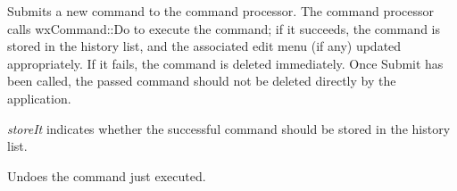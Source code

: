 Submits a new command to the command processor. The command processor
calls wxCommand::Do to execute the command; if it succeeds, the command
is stored in the history list, and the associated edit menu (if any) updated
appropriately. If it fails, the command is deleted
immediately. Once Submit has been called, the passed command should not
be deleted directly by the application.

{\it storeIt} indicates whether the successful command should be stored
in the history list.


\label{wxcommandprocessorundo}


Undoes the command just executed.


